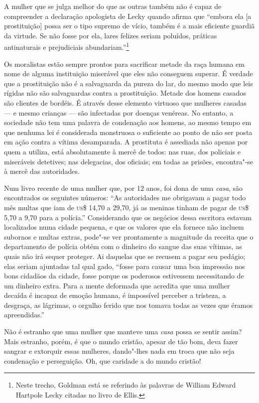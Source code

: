 A mulher que se julga melhor do que as outras também não é capaz de compreender a
declaração apologista de Lecky quando afirma que ``embora ela {[}a
prostituição{]} possa ser o tipo supremo de vício, também é a mais
eficiente guardiã da virtude. Se não fosse por ela, lares felizes seriam
poluídos, práticas antinaturais e prejudiciais abundariam.''\footnote{Neste
  trecho, Goldman está se referindo às palavras de William Edward
  Hartpole Lecky citadas no livro de Ellis.}

Os moralistas estão sempre prontos para sacrificar metade da raça humana
em nome de alguma instituição miserável que eles não conseguem superar.
É verdade que a prostituição não é a salvaguarda da pureza do lar, do
mesmo modo que leis rígidas não são salvaguardas contra a prostituição.
Metade dos homens casados são clientes de bordéis. É
através desse elemento virtuoso que mulheres casadas --- e mesmo crianças
--- são infectadas por doenças venéreas. No entanto, a sociedade não tem
uma palavra de condenação aos homens, ao mesmo tempo em que nenhuma lei
é considerada monstruosa o suficiente ao ponto de não ser posta em ação
contra a vítima desamparada. A prostituta é assediada não apenas por quem a utiliza, está absolutamente à mercê de todos: nas ruas, dos policiais e miseráveis detetives; nas delegacias, dos oficiais; em todas as prisões, encontra"-se à mercê das autoridades.

Num livro recente de uma mulher que, por 12 anos, foi dona de uma
\textit{casa}, são encontrados os seguintes números: ``As autoridades me
obrigavam a pagar todo mês multas que iam de \textsc{us}\$ 14,70 a 29,70, já as
meninas tinham de pagar de \textsc{us}\$ 5,70 a 9,70 para a polícia.''
Considerando que os negócios dessa escritora estavam localizados numa
cidade pequena, e que os valores que ela fornece não incluem subornos e
multas extras, pode"-se ver prontamente a magnitude da receita que o
departamento de polícia obtém com o dinheiro do sangue das suas vítimas,
as quais não irá sequer proteger. Ai daquelas que se recusem a pagar seu
pedágio; elas seriam ajuntadas tal qual gado, ``fosse para causar uma
boa impressão nos bons cidadãos da cidade, fosse porque os poderosos
estivessem necessitando de um dinheiro extra. Para a mente deformada que
acredita que uma mulher decaída é incapaz de emoção humana, é impossível
perceber a tristeza, a desgraça, as lágrimas, o orgulho ferido que nos
tomava todas as vezes que éramos apreendidas.''

Não é estranho que uma mulher que manteve uma \textit{casa} possa se sentir
assim? Mais estranho, porém, é que o mundo cristão, apesar de tão bom, deva fazer
sangrar e extorquir essas mulheres, dando"-lhes nada em troca que não
seja condenação e perseguição. Oh, que caridade a do mundo cristão!


